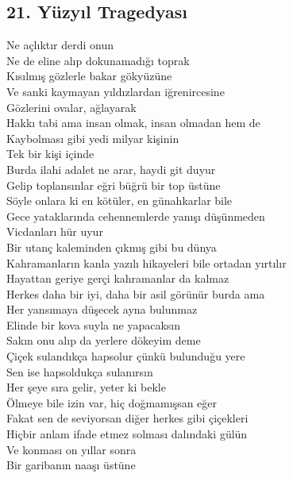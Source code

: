 \subsection{21. Yüzyıl Tragedyası}

Ne açlıktır derdi onun \\
Ne de eline alıp dokunamadığı toprak \\
Kısılmış gözlerle bakar gökyüzüne \\
Ve sanki kaymayan yıldızlardan iğrenircesine \\
Gözlerini ovalar, ağlayarak \\

\noindent\newline
Hakkı tabi ama insan olmak, insan olmadan hem de \\
Kaybolması gibi yedi milyar kişinin \\
Tek bir kişi içinde \\
Burda ilahi adalet ne arar, haydi git duyur \\
Gelip toplansınlar eğri büğrü bir top üstüne \\
Söyle onlara ki en kötüler, en günahkarlar bile \\
Gece yataklarında cehennemlerde yanışı düşünmeden \\
Vicdanları hür uyur \\

\noindent\newline
Bir utanç kaleminden çıkmış gibi bu dünya \\
Kahramanların kanla yazılı hikayeleri bile ortadan yırtılır \\
Hayattan geriye gerçi kahramanlar da kalmaz \\
Herkes daha bir iyi, daha bir asil görünür burda ama \\
Her yansımaya düşecek ayna bulunmaz \\

\noindent\newline
Elinde bir kova suyla ne yapacaksın \\
Sakın onu alıp da yerlere dökeyim deme \\
Çiçek sulandıkça hapsolur çünkü bulunduğu yere \\
Sen ise hapsoldukça sulanırsın \\

\noindent\newline
Her şeye sıra gelir, yeter ki bekle \\
Ölmeye bile izin var, hiç doğmamışsan eğer \\
Fakat sen de seviyorsan diğer herkes gibi çiçekleri \\
Hiçbir anlam ifade etmez solması dalındaki gülün \\
Ve konması on yıllar sonra \\
Bir garibanın naaşı üstüne \\


